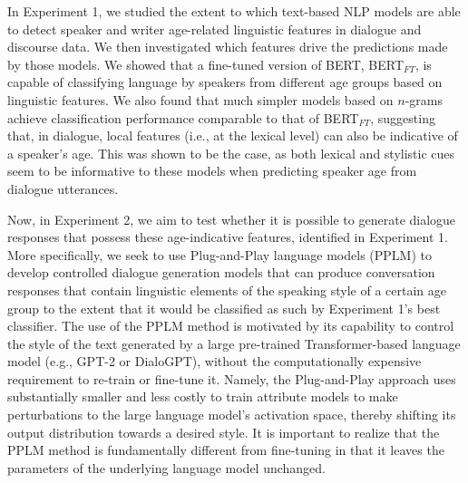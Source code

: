 In Experiment 1, we studied the extent to which text-based NLP models are able to detect speaker and writer age-related linguistic features in dialogue and discourse data. We then investigated which features drive the predictions made by those models. We showed that a fine-tuned version of BERT, BERT$_{FT}$, is capable of classifying language by speakers from different age groups based on linguistic features. We also found that much simpler models based on $n$-grams achieve classification performance comparable to that of BERT$_{FT}$, suggesting that, in dialogue, local features (i.e., at the lexical level) can also be indicative of a speaker's age. This was shown to be the case, as both lexical and stylistic cues seem to be informative to these models when predicting speaker age from dialogue utterances.

Now, in Experiment 2, we aim to test whether it is possible to generate dialogue responses that possess these age-indicative features, identified in Experiment 1. 
More specifically, we seek to use Plug-and-Play language models (PPLM) \citep{dathathri2019plug} to develop controlled dialogue generation models that can produce conversation responses that contain linguistic elements of the speaking style of a certain age group to the extent that it would be classified as such by Experiment 1's best classifier. The use of the PPLM method is motivated by its capability to control the style of the text generated by a large pre-trained Transformer-based language model (e.g., GPT-2 or DialoGPT), without the computationally expensive requirement to re-train or fine-tune it. Namely, the Plug-and-Play approach uses substantially smaller and less costly to train attribute models to make perturbations to the large language model's activation space, thereby shifting its output distribution towards a desired style. It is important to realize that the PPLM method is fundamentally different from fine-tuning in that it leaves the parameters of the underlying language model unchanged.

